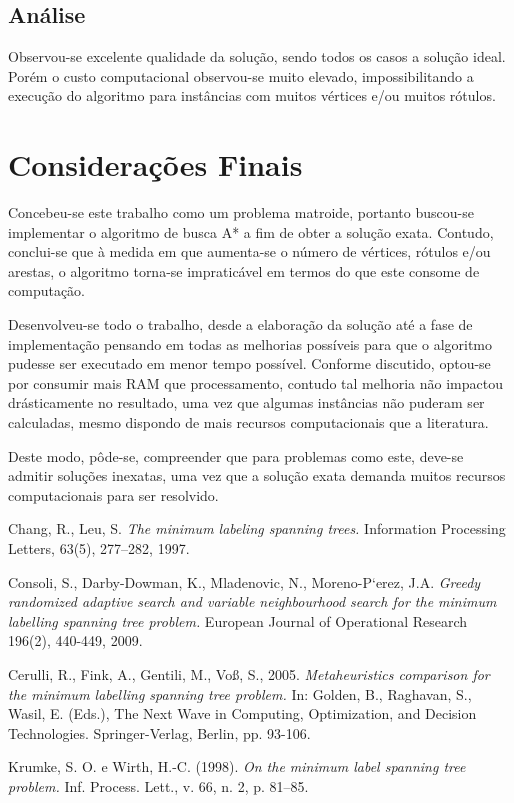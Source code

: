 \documentclass[12pt]{article}
\begin{document}
	\subsection{Análise}\label{sec:analise}

	Observou-se excelente qualidade da solução, sendo todos os casos a solução ideal. Porém o custo computacional observou-se muito elevado, impossibilitando a execução do algoritmo para instâncias com muitos vértices e/ou muitos rótulos.

\section{Considerações Finais}\label{sec:conclusao}
	
	Concebeu-se este trabalho como um problema matroide, portanto buscou-se implementar o algoritmo de busca A* a fim de obter a solução exata. Contudo, conclui-se que à medida em que aumenta-se o número de vértices, rótulos e/ou arestas, o algoritmo torna-se impraticável em termos do que este consome de computação.

	Desenvolveu-se todo o trabalho, desde a elaboração da solução até a fase de implementação pensando em todas as melhorias possíveis para que o algoritmo pudesse ser executado em menor tempo possível. Conforme discutido, optou-se por consumir mais RAM que processamento, contudo tal melhoria não impactou drásticamente no resultado, uma vez que algumas instâncias não puderam ser calculadas, mesmo dispondo de mais recursos computacionais que a literatura.

	Deste modo, pôde-se, compreender que para problemas como este, deve-se admitir soluções inexatas, uma vez que a solução exata demanda muitos recursos computacionais para ser resolvido.




\begin{thebibliography}{}

	Chang, R., Leu, S.
	\newblock \textit{The minimum labeling spanning trees.}
	\newblock Information Processing Letters, 63(5), 277–282, 1997.
	
	Consoli, S., Darby-Dowman, K., Mladenovic, N., Moreno-P`erez, J.A.
	\newblock \textit{Greedy randomized adaptive search and variable neighbourhood search for the minimum labelling spanning tree problem.}
	\newblock European Journal of Operational Research 196(2), 440-449, 2009.

	Cerulli, R., Fink, A., Gentili, M., Voß, S., 2005.
	\newblock \textit{Metaheuristics comparison for the minimum labelling spanning tree problem.}
	\newblock In: Golden, B., Raghavan, S., Wasil, E. (Eds.), The Next Wave in Computing, Optimization, and Decision Technologies.
	\newblock Springer-Verlag, Berlin, pp. 93-106.

	\newblock Krumke, S. O. e Wirth, H.-C. (1998).
	\newblock \textit{On the minimum label spanning tree problem.}
	\newblock Inf. Process. Lett., v. 66, n. 2, p. 81–85.

\end{thebibliography}
\end{document}
